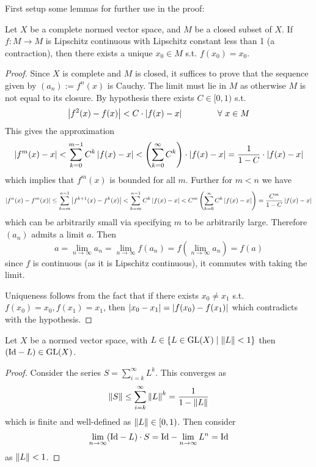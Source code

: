 \documentclass{article}
\begin{document}
First setup some lemmas for further use in the proof:

\begin{lemma}\label{lem: contraction mapping principle}
    Let $X$ be a complete normed vector space, and $M$ be a closed subset of $X$. If $f: M \to M$ is Lipschitz continuous with Lipschitz constant less than 1 (a contraction), then there exists a unique $x_0 \in M$ s.t. $f(x_0) = x_0$.
\end{lemma}

\begin{proof}
    Since $X$ is complete and $M$ is closed, it suffices to prove that the sequence given by $(a_n) := f^n(x)$ is Cauchy. The limit must lie in $M$ as otherwise $M$ is not equal to its closure. By hypothesis there exists $C \in [0, 1)$ s.t.
    \[
        \left|f^2(x) - f(x)\right| < C \cdot \left|f(x) - x\right| \qquad \qquad \forall \ x \in M
    \]
    This gives the approximation
    \[
        \left|f^m(x) - x\right| < \sum_{k=0}^{m-1} C^k \left|f(x) - x\right| < \left( \sum_{k=0}^{\infty} C^k \right) \cdot \left|f(x) - x\right| = \frac{1}{1 - C} \cdot \left|f(x) - x\right|
    \]
    which implies that $f^m(x)$ is bounded for all $m$. Further for $m < n$ we have
    \[
        \left|f^n(x) - f^m(x)\right| \leq \sum_{k=m}^{n-1} \left|f^{k+1}(x) - f^k(x)\right| < \sum_{k=m}^{n-1} C^k \left|f(x) - x\right| < C^m \left(\sum_{k=0}^{\infty} C^k \left|f(x) - x\right|\right) = \frac{C^m}{1 - C}\left|f(x) - x\right|
    \]
    which can be arbitrarily small via specifying $m$ to be arbitrarily large. Therefore $(a_n)$ admits a limit $a$. Then 
    \[
        a = \lim_{n \to \infty} a_n = \lim_{n \to \infty} f(a_n) = f(\lim_{n \to \infty} a_n) = f(a)
    \]
    since $f$ is continuous (as it is Lipschitz continuous), it commutes with taking the limit.

    Uniqueness follows from the fact that if there exists $x_0 \neq x_1$ s.t. $f(x_0) = x_0, f(x_1) = x_1$, then $\left|x_0 - x_1\right| = \left|f(x_0) - f(x_1)\right|$ which contradicts with the hypothesis.
\end{proof}

\begin{lemma}\label{lem: map norm invertible}
    Let $X$ be a normed vector space, with $L \in \{L \in \mathrm{GL}(X) \mid \left\|L\right\| < 1\}$ then $(\mathrm{Id} - L) \in \mathrm{GL}(X)$. 
\end{lemma}

\begin{proof}
    Consider the series $S = \sum_{i=k}^{\infty} L^k$. This converges as
    \[
        \left\|S\right\| \leq \sum_{i=k}^{\infty} \left\|L\right\|^k = \frac{1}{1 - \left\|L\right\|}
    \]
    which is finite and well-defined as $\left\|L\right\| \in [0, 1)$. Then consider
    \[
        \lim_{n \to \infty}(\mathrm{Id} - L)\cdot S = \mathrm{Id} - \lim_{n \to \infty} L^n = \mathrm{Id}
    \]
    as $\left\|L\right\| < 1$. 
\end{proof}
\end{document}
